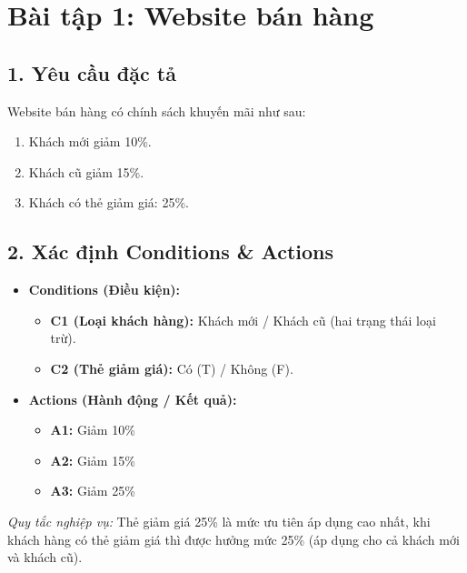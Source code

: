 \documentclass[11pt,a4paper]{article}
\begin{document}
\section*{Bài tập 1: Website bán hàng}

\subsection*{1. Yêu cầu đặc tả}
Website bán hàng có chính sách khuyến mãi như sau:
\begin{enumerate}[noitemsep]
    \item Khách mới giảm 10\%.
    \item Khách cũ giảm 15\%.
    \item Khách có thẻ giảm giá: 25\%.
\end{enumerate}

\subsection*{2. Xác định Conditions \& Actions}
\begin{itemize}[noitemsep]
    \item \textbf{Conditions (Điều kiện):}
    \begin{itemize}[noitemsep]
        \item \textbf{C1 (Loại khách hàng):} Khách mới / Khách cũ (hai trạng thái loại trừ).
        \item \textbf{C2 (Thẻ giảm giá):} Có (T) / Không (F).
    \end{itemize}
    \item \textbf{Actions (Hành động / Kết quả):}
    \begin{itemize}[noitemsep]
        \item \textbf{A1:} Giảm 10\%
        \item \textbf{A2:} Giảm 15\%
        \item \textbf{A3:} Giảm 25\%
    \end{itemize}
\end{itemize}

\textit{Quy tắc nghiệp vụ:} Thẻ giảm giá 25\% là mức ưu tiên áp dụng cao nhất, khi khách hàng có thẻ giảm giá thì được hưởng mức 25\% (áp dụng cho cả khách mới và khách cũ).
\end{document}
